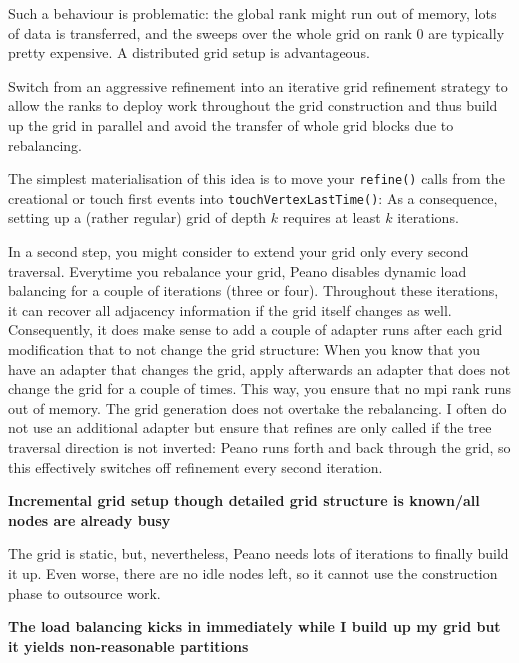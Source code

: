 Such a behaviour is problematic: the global rank might run out of memory, lots
of data is transferred, and the sweeps over the whole grid on rank 0 are
typically pretty expensive. 
A distributed grid setup is advantageous.

\begin{solution}
Switch from an aggressive
refinement into an iterative grid refinement strategy to allow the ranks to
deploy work throughout the grid construction and thus build up the grid in parallel and avoid the transfer of whole grid
blocks due to rebalancing.
\end{solution}

\noindent
The simplest materialisation of this idea is to 
move your \texttt{refine()} calls from the creational or touch first
events into \texttt{touchVertexLastTime()}:
As a consequence, setting up a (rather regular) grid of depth $k$ requires at
least $k$ iterations.

In a second step, you might consider to extend your grid only every second
traversal.
Everytime you rebalance your grid, Peano disables dynamic load balancing
for a couple of iterations (three or four). Throughout these iterations, it
can recover all adjacency information if the grid itself changes as well.
Consequently, it does make sense to add a couple of adapter runs after each
grid modification that to not change the grid structure: When you know that
you have an adapter that changes the grid, apply afterwards an adapter that
does not change the grid for a couple of times. This way, you ensure that no
mpi rank runs out of memory. The grid generation does not overtake the rebalancing.
I often do not use an additional adapter but ensure that refines are only called
if the tree traversal direction is not inverted: 
Peano runs forth and back through the grid, so this effectively switches off
refinement every second iteration. 



{\bf Incremental grid setup though detailed grid structure is known/all
nodes are already busy}


\begin{smell}
The grid is static, but, nevertheless, Peano needs lots of iterations to finally
build it up. Even worse, there are no idle nodes left, so it cannot use the
construction phase to outsource work.
\end{smell}



{\bf The load balancing kicks in immediately while I build up my grid but it
yields non-reasonable partitions}


